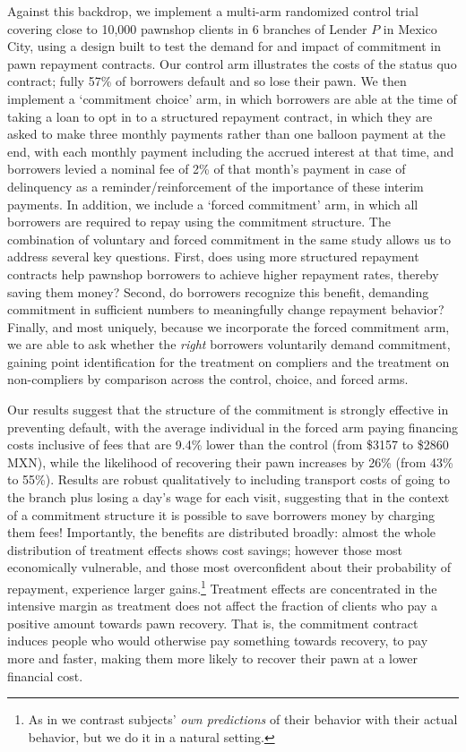 \documentclass[oneside,11pt]{article}
\begin{document}
Against this backdrop, we implement a multi-arm randomized control trial covering close to 10,000 pawnshop clients in 6 branches of Lender $P$ in Mexico City, using a design built to test the demand for and impact of commitment in pawn repayment contracts.  Our control arm illustrates the costs of the status quo contract; fully 57\% of borrowers default and so lose their pawn.  We then implement a `commitment choice’ arm, in which borrowers are able at the time of taking a loan to opt in to a structured repayment contract, in which they are asked to make three monthly payments rather than one balloon payment at the end, with each monthly payment including the accrued interest at that time, and borrowers levied a nominal fee of 2\% of that month's payment in case of delinquency as a reminder/reinforcement of the importance of these interim payments.  In addition, we include a `forced commitment’ arm, in which all borrowers are required to repay using the commitment structure.  The combination of voluntary and forced commitment in the same study allows us to address several key questions.  First, does using more structured repayment contracts help pawnshop borrowers to achieve higher repayment rates, thereby saving them money?  Second, do borrowers recognize this benefit, demanding commitment in sufficient numbers to meaningfully change repayment behavior?  Finally, and most uniquely, because we incorporate the forced commitment arm, we are able to ask whether the \textit{right} borrowers voluntarily demand commitment, gaining point identification for the treatment on compliers and the treatment on non-compliers by comparison across the control, choice, and forced arms. 
	
Our results suggest that the structure of the commitment is strongly effective in preventing default, with the average individual in the forced arm paying financing costs inclusive of fees that are 9.4\% lower than the control (from \$3157 to \$2860 MXN), while the likelihood of recovering their pawn increases by 26\% (from 43\% to 55\%).  Results are robust qualitatively to including transport costs of going to the branch plus losing a day's wage for each visit, suggesting that in the context of a commitment structure it is possible to save borrowers money by charging them fees!  Importantly, the benefits are distributed broadly: almost the whole distribution of treatment effects shows cost savings; however those most economically vulnerable, and those most overconfident about their probability of repayment, experience larger gains.\footnote{As in \cite{Rabin2018} we contrast subjects' \textit{own predictions} of their behavior with their actual behavior, but we do it in a natural setting.}  Treatment effects are concentrated in the intensive margin as treatment does not affect the fraction of clients who pay a positive amount towards pawn recovery. That is, the commitment contract induces people who would otherwise pay something towards recovery, to pay more and faster, making them more likely to recover their pawn at a lower financial cost.  
\end{document}

